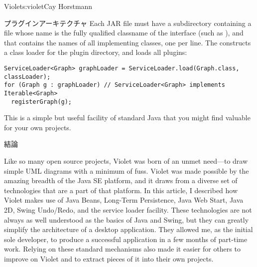\begin{aosachapter}{Violet}{s:violet}{Cay Horstmann}
\begin{aosasect1}{プラグインアーキテクチャ}
Each JAR file must have a subdirectory 
containing a file whose name is the fully qualified classname of the
interface (such as ), and that
contains the names of all implementing classes, one per line.
The  constructs a class loader for the plugin
directory, and loads all plugins:

\begin{verbatim}
ServiceLoader<Graph> graphLoader = ServiceLoader.load(Graph.class, classLoader);
for (Graph g : graphLoader) // ServiceLoader<Graph> implements Iterable<Graph>
  registerGraph(g); 
\end{verbatim}

This is a simple but useful facility of standard Java that you might
find valuable for your own projects.

\end{aosasect1}

\begin{aosasect1}{結論}

Like so many open source projects, Violet was born of an unmet
need---to draw simple UML diagrams with a minimum of fuss. Violet was
made possible by the amazing breadth of the Java SE platform, and it
draws from a diverse set of technologies that are a part of that
platform. In this article, I described how Violet makes use of Java
Beans, Long-Term Persistence, Java Web Start, Java 2D, Swing
Undo/Redo, and the service loader facility.  These technologies are
not always as well understood as the basics of Java and Swing, but
they can greatly simplify the architecture of a desktop
application. They allowed me, as the initial sole developer, to
produce a successful application in a few months of part-time work.
Relying on these standard mechanisms also made it easier for others to
improve on Violet and to extract pieces of it into their own projects.

\end{aosasect1}

\end{aosachapter}
